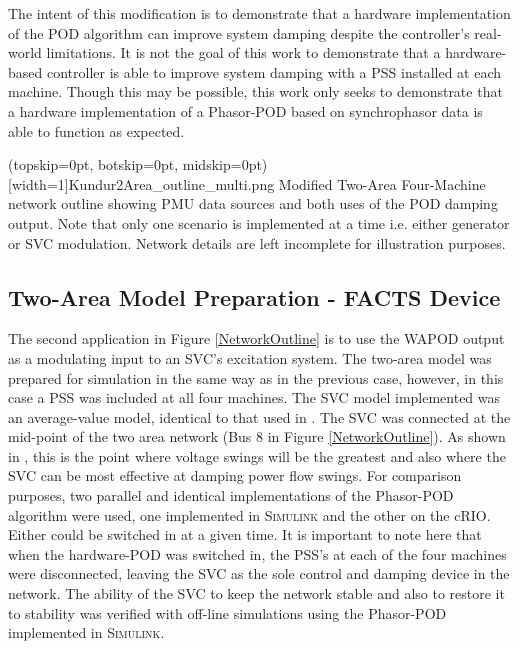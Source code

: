\documentclass{ieeeaccess}
\begin{document}
The intent of this modification is to demonstrate that a hardware implementation of the POD algorithm can improve system damping despite the controller\rq{s} real-world limitations. It is not the goal of this work to demonstrate that a hardware-based controller is able to improve system damping with a PSS installed at each machine. Though this may be possible, this work only seeks to demonstrate that a hardware implementation of a Phasor-POD based on synchrophasor data is able to function as expected.

\Figure[tbp](topskip=0pt, botskip=0pt, midskip=0pt)[width=1\textwidth]{Kundur2Area_outline_multi.png}
{Modified Two-Area Four-Machine network outline showing PMU data sources and both uses of the POD damping output. Note that only one scenario is implemented at a time i.e. either generator or SVC modulation. Network details are left incomplete for illustration purposes.\label{NetworkOutline}} %

\subsection{Two-Area Model Preparation - FACTS Device}

The second application in Figure \ref{NetworkOutline} is to use the WAPOD output as a modulating input to an SVC's excitation system. The two-area model was prepared for simulation in the same way as in the previous case, however, in this case a PSS was included at all four machines. The SVC model implemented was an average-value model, identical to that used in \cite{PhasorPODImplement}. The SVC was connected at the mid-point of the two area network (Bus 8 in Figure \ref{NetworkOutline}). As shown in \cite{sVARdamp}, this is the point where voltage swings will be the greatest and also where the SVC can be most effective at damping power flow swings. For comparison purposes, two parallel and identical implementations of the Phasor-POD algorithm were used, one implemented in \textsc{Simulink} and the other on the cRIO. Either could be switched in at a given time. It is important to note here that when the hardware-POD was switched in, the PSS's at each of the four machines were disconnected, leaving the SVC as the sole control and damping device in the network. The ability of the SVC to keep the network stable and also to restore it to stability was verified with off-line simulations using the Phasor-POD implemented in \textsc{Simulink}.
\end{document}
